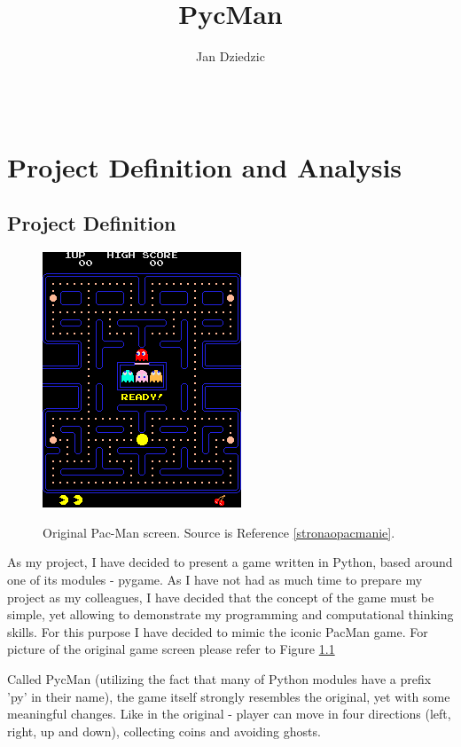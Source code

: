 \documentclass[11pt,a4paper]{report}
\author{Jan Dziedzic}
\title{PycMan}
\newenvironment{img}{
	\begin{center}
		\begin{figure}[H]
			\begin{center}
			
}{
	\end{center}
		\end{figure}
			\end{center}
}
\begin{document}
	\maketitle
	\newpage
	\thispagestyle{empty}
	$$$$
	\newpage
	\thispagestyle{empty}
	\tableofcontents
	\chapter{Project Definition and Analysis}
		\newpage
		\section{Project Definition}
		
			\begin{img}
			\includegraphics{images/1_1}\\
			\caption{Original Pac-Man screen. Source is Reference \ref{stronaopacmanie}.}
			\label{oryg_pacman}
			\end{img}
		
			As my project, I have decided to present a game written in Python, based around one of its modules - pygame. As I have not had as much time to prepare my project as my colleagues, I have decided that the concept of the game must be simple, yet allowing to demonstrate my programming and computational thinking skills. For this purpose I have decided to mimic the iconic PacMan game.
			For picture of the original game screen please refer to Figure \ref{oryg_pacman}
			
			
		
			Called PycMan (utilizing the fact that many of Python modules have a prefix 'py' in their name), the game itself strongly resembles the original, yet with some meaningful changes. Like in the original - player can move in four directions (left, right, up and down), collecting coins and avoiding ghosts.
			
\end{document}
